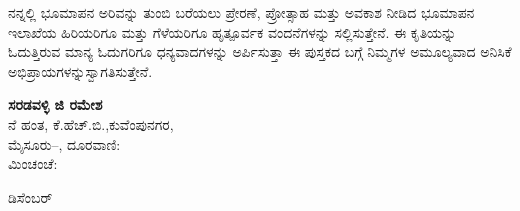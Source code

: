 ನನ್ನಲ್ಲಿ ಭೂಮಾಪನ ಅರಿವನ್ನು ತುಂಬಿ ಬರೆಯಲು ಪ್ರೇರಣೆ, ಪ್ರೋತ್ಸಾಹ ಮತ್ತು ಅವಕಾಶ ನೀಡಿದ ಭೂಮಾಪನ ಇಲಾಖೆಯ ಹಿರಿಯರಿಗೂ ಮತ್ತು ಗೆಳೆಯರಿಗೂ ಹೃತ್ಪೂರ್ವಕ ವಂದನೆ\-ಗಳನ್ನು ಸಲ್ಲಿಸುತ್ತೇನೆ. ಈ ಕೃತಿಯನ್ನು ಓದುತ್ತಿರುವ ಮಾನ್ಯ ಓದುಗರಿಗೂ ಧನ್ಯವಾದಗಳನ್ನು ಅರ್ಪಿಸುತ್ತಾ ಈ ಪುಸ್ತಕದ ಬಗ್ಗೆ ನಿಮ್ಮಗಳ ಅಮೂಲ್ಯವಾದ ಅನಿಸಿಕೆ ಅಭಿಪ್ರಾಯಗಳನ್ನು\break ಸ್ವಾಗತಿಸುತ್ತೇನೆ.

\bigskip

\begin{flushright}
\textbf{ಸರಡವಳ್ಳಿ ಜಿ ರಮೇಶ}\\ನೆ ಹಂತ, ಕೆ.ಹೆಚ್​.ಬಿ.,ಕುವೆಂಪುನಗರ, \\ ಮೈಸೂರು–, ದೂರವಾಣಿ: \\ಮಿಂಚಂಚೆ: 
\end{flushright}

\vskip -2.6cm

\noindent
{} ಡಿಸೆಂಬರ್ 


